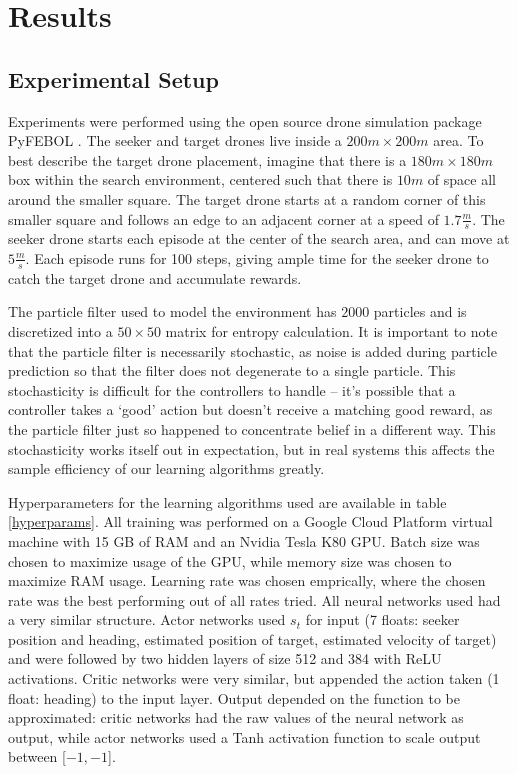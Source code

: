 \documentclass[10pt,twocolumn,letterpaper]{article}
\begin{document}
\section{Results}


\subsection{Experimental Setup}
Experiments were performed using the open source drone simulation package PyFEBOL \cite{PyFEBOL}.
The seeker and target drones live inside a $200m \times 200m$ area.
To best describe the target drone placement, imagine that there is a $180m \times 180m$ box within the search environment, centered such that there is $10m$ of space all around the smaller square.
The target drone starts at a random corner of this smaller square and follows an edge to an adjacent corner at a speed of $1.7\frac{m}{s}$.
The seeker drone starts each episode at the center of the search area, and can move at $5\frac{m}{s}$.
Each episode runs for 100 steps, giving ample time for the seeker drone to catch the target drone and accumulate rewards.

The particle filter used to model the environment has $2000$ particles and is discretized into a $50 \times 50$ matrix for entropy calculation.
It is important to note that the particle filter is necessarily stochastic, as noise is added during particle prediction so that the filter does not degenerate to a single particle.
This stochasticity is difficult for the controllers to handle -- it's possible that a controller takes a `good' action but doesn't receive a matching good reward, as the particle filter just so happened to concentrate belief in a different way.
This stochasticity works itself out in expectation, but in real systems this affects the sample efficiency of our learning algorithms greatly.

Hyperparameters for the learning algorithms used are available in table \ref{hyperparams}.
All training was performed on a Google Cloud Platform virtual machine with 15 GB of RAM and an Nvidia Tesla K80 GPU.
Batch size was chosen to maximize usage of the GPU, while memory size was chosen to maximize RAM usage.
Learning rate was chosen emprically, where the chosen rate was the best performing out of all rates tried.
All neural networks used had a very similar structure.
Actor networks used $s_t$ for input (7 floats: seeker position and heading, estimated position of target, estimated velocity of target) and were followed by two hidden layers of size 512 and 384 with ReLU activations.
Critic networks were very similar, but appended the action taken (1 float: heading) to the input layer.
Output depended on the function to be approximated: critic networks had the raw values of the neural network as output, while actor networks used a Tanh activation function to scale output between [$-1, -1$].
\end{document}
